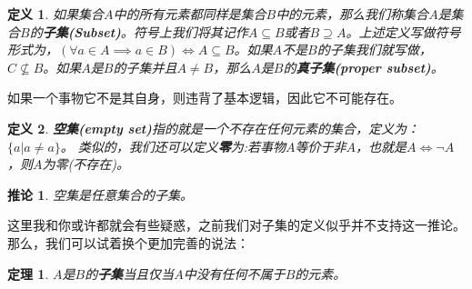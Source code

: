 \documentclass[mathserif,hyperref,UTF8,openany,b5paper]{ctexbook}
\newtheorem{defn}{定义}[section]
\newtheorem{thm}{定理}[section]
\newtheorem{cor}{推论}[section]
\begin{document}
\begin{defn}
如果集合$A$中的所有元素都同样是集合$B$中的元素，那么我们称集合$A$是集合$B$的\textbf{子集(Subset)}。符号上我们将其记作$A \subseteq B$或者$B \supseteq A$。上述定义写做符号形式为，$(\forall a\in A \implies a \in B) \iff A \subseteq B $。如果$A$不是$B$的子集我们就写做，$C \not \subseteq B$。如果$A$是$B$的子集并且$A \neq B$，那么$A$是$B$的\textbf{真子集(proper subset)}。
\end{defn}
如果一个事物它不是其自身，则违背了基本逻辑，因此它不可能存在。
\begin{defn}
\textbf{空集(empty set)}指的就是一个不存在任何元素的集合，定义为：$\{a|a\neq a\}$。
类似的，我们还可以定义\textbf{零}为:若事物$A$等价于非$A$，也就是$A\Leftrightarrow\neg A$，则$A$为零(不存在)。
\end{defn}
\begin{cor}
空集是任意集合的子集。
\end{cor}
这里我和你或许都就会有些疑惑，之前我们对子集的定义似乎并不支持这一推论。那么，我们可以试着换个更加完善的说法：
\begin{thm}
$A$是$B$的\textbf{子集}当且仅当$A$中没有任何不属于$B$的元素。
\end{thm}
\end{document}
